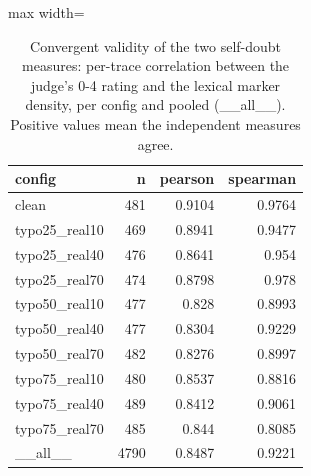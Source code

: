 \documentclass[11pt]{article}
\begin{document}
\begin{table}[H]
\centering
\caption{Convergent validity of the two self-doubt measures: per-trace correlation between the judge's 0-4 rating and the lexical marker density, per config and pooled (\_\_all\_\_). Positive values mean the independent measures agree.}
\small
\begin{adjustbox}{max width=\textwidth}
\begin{tabular}{lrrr}
\toprule
\textbf{config} & \textbf{n} & \textbf{pearson} & \textbf{spearman} \\
\midrule
clean & 481 & 0.9104 & 0.9764 \\
typo25\_real10 & 469 & 0.8941 & 0.9477 \\
typo25\_real40 & 476 & 0.8641 & 0.954 \\
typo25\_real70 & 474 & 0.8798 & 0.978 \\
typo50\_real10 & 477 & 0.828 & 0.8993 \\
typo50\_real40 & 477 & 0.8304 & 0.9229 \\
typo50\_real70 & 482 & 0.8276 & 0.8997 \\
typo75\_real10 & 480 & 0.8537 & 0.8816 \\
typo75\_real40 & 489 & 0.8412 & 0.9061 \\
typo75\_real70 & 485 & 0.844 & 0.8085 \\
\_\_all\_\_ & 4790 & 0.8487 & 0.9221 \\
\bottomrule
\end{tabular}
\end{adjustbox}
\end{table}
\end{document}
